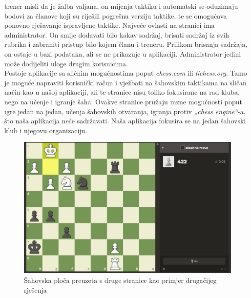 			trener misli da je žalba valjana, on mijenja taktiku i automatski se
			oduzimaju bodovi za članove koji su riješili pogrešnu verziju taktike,
			te se omogućava ponovno rješavanje ispravljene taktike. Najveće ovlasti
			na stranici ima administrator. On smije dodavati bilo kakav sadržaj,
			brisati sadržaj iz svih rubrika i zabraniti pristup bilo kojem članu i
			treneru. Prilikom brisanja sadržaja, on ostaje u bazi podataka, ali se
			ne prikazuje u aplikaciji. Administrator jedini može dodijeliti uloge
			drugim korisnicima. \\
			Postoje aplikacije sa sličnim mogućnostima poput \textit{chess.com} ili \textit{lichess.org}. Tamo
			je moguće napraviti korisnički račun i vježbati na šahovskim taktikama
			na sličan način kao u našoj aplikaciji, ali te stranice nisu toliko
			fokusirane na rad kluba, nego na učenje i igranje šaha. Ovakve stranice
			pružaju razne mogućnosti poput igre jedan na jedan, učenja šahovskih
			otvaranja, igranja protiv \textit{„chess engine``}-a, što naša aplikacija neće
			sadržavati. Naša aplikacija fokusira se na jedan šahovski klub i njegovu
			organizaciju. \\
			
				\begin{figure}[H]
				\centering
				\includegraphics[scale=0.3]{slike/sah-slicno rjesenje.jpeg} %
				\caption{Šahovska ploča preuzeta s druge stranice kao primjer drugačijeg rješenja}
				\label{fig:UC$<$broj obrasca$>$}
			\end{figure}
		
